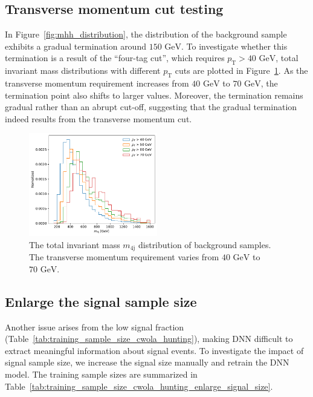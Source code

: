 \documentclass[12pt]{article}
\begin{document}
    \subsection{Transverse momentum cut testing}%
    \label{sub:pt_cut_testing}
        In Figure~\ref{fig:mhh_distribution}, the distribution of the background sample exhibits a gradual termination around $\text{150 GeV}$. To investigate whether this termination is a result of the ``four-tag cut'', which requires $p_{\text{T}} > \text{40 GeV}$, total invariant mass distributions with different $p_{\text{T}}$ cuts are plotted in Figure~\ref{fig:mhh_distribution_bkg_pt}. As the transverse momentum requirement increases from $\text{40 GeV}$ to $\text{70 GeV}$, the termination point also shifts to larger values. Moreover, the termination remains gradual rather than an abrupt cut-off, suggesting that the gradual termination indeed results from the transverse momentum cut.
        \begin{figure}[htpb]
            \centering
            \includegraphics[width=0.5\textwidth]{m4j_distribution_background_various_pt_cut.pdf}
            \caption{The total invariant mass $m_{\text{4j}}$ distribution of background samples. The transverse momentum requirement varies from $\text{40 GeV}$ to $\text{70 GeV}$.}
            \label{fig:mhh_distribution_bkg_pt}
        \end{figure}
    \subsection{Enlarge the signal sample size}%
    \label{sub:enlarge_the_signal_sample_size}
        Another issue arises from the low signal fraction (Table~\ref{tab:training_sample_size_cwola_hunting}), making DNN difficult to extract meaningful information about signal events. To investigate the impact of signal sample size, we increase the signal size manually and retrain the DNN model. The training sample sizes are summarized in Table~\ref{tab:training_sample_size_cwola_hunting_enlarge_signal_size}.
\end{document}
